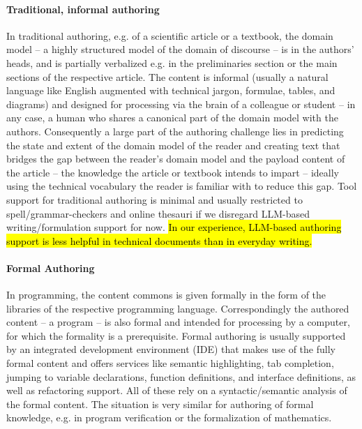 \documentclass[runningheads]{llncs}
\def\edited#1{\hl{#1}}
\begin{document}
\paragraph{Traditional, informal authoring}
In traditional authoring, e.g. of a scientific article or a textbook, the domain model --
a highly structured model of the domain of discourse -- is in the authors' heads, and is
partially verbalized e.g. in the preliminaries section or the main sections of the
respective article. The content is informal (usually a natural language like English
augmented with technical jargon, formulae, tables, and diagrams) and designed for
processing via the brain of a colleague or student -- in any case, a human who shares a
canonical part of the domain model with the authors. Consequently a large part of the
authoring challenge lies in predicting the state and extent of the domain model of the
reader and creating text that bridges the gap between the reader's domain model and the
payload content of the article -- the knowledge the article or textbook intends to impart
-- ideally using the technical vocabulary the reader is familiar with to reduce this
gap. Tool support for traditional authoring is minimal and usually restricted to
spell/grammar-checkers and online thesauri if we disregard LLM-based writing/formulation
support for now.
\edited{
In our experience, LLM-based authoring support is less helpful in technical documents
than in everyday writing.
}

\paragraph{Formal Authoring}
In programming, the content commons is given formally in the form of the libraries of the
respective programming language. Correspondingly the authored content -- a program -- is
also formal and intended for processing by a computer, for which the formality is a
prerequisite. Formal authoring is usually supported by an integrated development
environment (IDE) that makes use of the fully formal content and offers services like
semantic highlighting, tab completion, jumping to variable declarations, function
definitions, and interface definitions, as well as refactoring support. All of these rely
on a syntactic/semantic analysis of the formal content. The situation is very similar for
authoring of formal knowledge, e.g. in program verification or the formalization of
mathematics.
\end{document}
